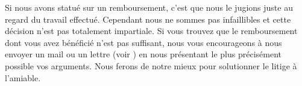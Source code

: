 ﻿Si nous avons statué sur un remboursement, c'est que nous le jugions juste au regard du travail effectué. Cependant nous ne sommes pas infaillibles et cette décision n'est pas totalement impartiale. Si vous trouvez que le remboursement dont vous avez bénéficié n'est pas suffisant, nous vous encourageons à nous envoyer un mail ou un lettre (voir ) en nous présentant le plus précisément possible vos arguments. Nous ferons de notre mieux pour solutionner le litige à l'amiable.